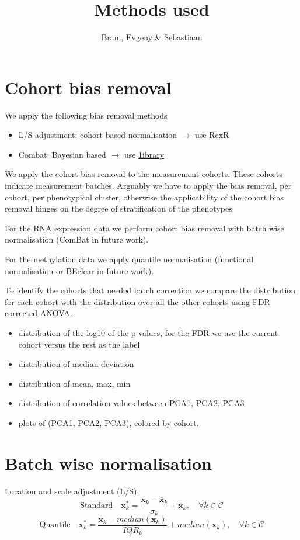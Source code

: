 \documentclass[a4paper,10pt]{article}
\title{Methods used}
\author{Bram, Evgeny \& Sebastiaan}
\begin{document}
\section{Cohort bias removal}
%
We apply the following bias removal methods
%
\begin{itemize}
\item L/S adjustment: cohort based normalisation $\rightarrow$ use RexR
\item Combat: Bayesian based $\rightarrow$ use \href{http://www.bu.edu/jlab/wp-assets/ComBat/Abstract.html}{1ibrary} 
\end{itemize}

We apply the cohort bias removal to the measurement cohorts. These cohorts indicate measurement batches.
%
Arguably we have to apply the bias removal, per cohort, per phenotypical cluster, otherwise
the applicability of the cohort bias removal hinges on the degree of stratification of the phenotypes.

For the RNA expression data we perform cohort bias removal with batch wise normalisation (ComBat in future work).

For the methylation data we apply quantile normalisation (functional normalisation or BEclear in future work).

To identify the cohorts that needed batch correction we compare the distribution for each cohort 
with the distribution over all the other cohorts using FDR corrected ANOVA.

\begin{itemize}
\item distribution of the log10 of the p-values, for the FDR we use the current cohort versus the rest as the label
\item distribution of median deviation
\item distribution of mean, max, min 
\item distribution of correlation values between PCA1, PCA2, PCA3
\item plots of (PCA1, PCA2, PCA3), colored by cohort.
\end{itemize}
%

\section{Batch wise normalisation}
%
Location and scale adjustment (L/S):
\begin{equation}
\mbox{Standard}\quad \mathbf{x}^*_k= \frac{\mathbf{x}_k-\overline{\mathbf{x}}_k}{\sigma_k} + \overline{\mathbf{x}}_k,\quad \forall k\in \mathcal{C}
\end{equation}
\begin{equation}
\mbox{Quantile}\quad \mathbf{x}^*_k= \frac{\mathbf{x}_k-median{(\mathbf{x}_k)}}{IQR_k} + median{(\mathbf{x}_k)},\quad \forall k\in \mathcal{C}
\end{equation}
%
\end{document}
